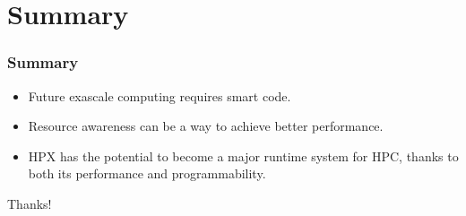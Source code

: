 \documentclass[compress]{beamer}
\begin{document}
\section{Summary}
\begin{frame}
	\frametitle{Summary}
	\begin{itemize}
		\item Future exascale computing requires smart code.
		\item Resource awareness can be a way to achieve better performance.
		\item HPX has the potential to become a major runtime system for HPC, thanks to both its performance and programmability.
	\end{itemize}
	\pause
	\vspace{5mm}
	\begin{center}
		\LARGE Thanks! \normalsize
	\end{center}
\end{frame}


\end{document}
